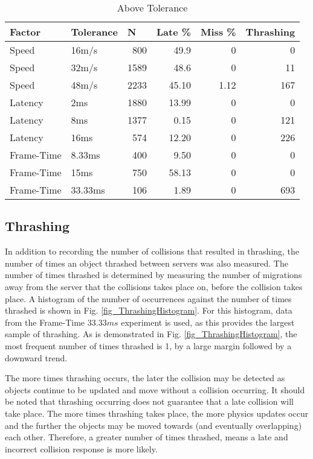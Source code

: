 \begin{table}
	\centering
	\begin{tabular}{llrrrr}
		\toprule
		\multicolumn{1}{l}{Factor} & \multicolumn{1}{l}{Tolerance} & \multicolumn{1}{l}{N} & \multicolumn{1}{l}{Late \%} & \multicolumn{1}{l}{Miss \%} & \multicolumn{1}{l}{Thrashing}  \\ 
		\hline
		Speed      & 16m/s     & 800  &   49.9  & 0           & 0               \\
		Speed      & 32m/s     & 1589  &  48.6  & 0           & 11              \\
		Speed      & 48m/s     & 2233  &  45.10 & 1.12        & 167             \\
		Latency    & 2ms       & 1880  &  13.99 & 0           & 0               \\
		Latency    & 8ms       & 1377  &  0.15  & 0           & 121             \\
		Latency    & 16ms      & 574  &   12.20 & 0           & 226             \\
		Frame-Time & 8.33ms    & 400  &   9.50  & 0           & 0               \\
		Frame-Time & 15ms      & 750  &   58.13 & 0           & 0               \\
		Frame-Time & 33.33ms   & 106  &   1.89  & 0           & 693             \\
		\bottomrule
	\end{tabular}
	\caption{Above Tolerance}
	\label{tab_AboveTolerance}
\end{table}

\subsection{Thrashing}
In addition to recording the number of collisions that resulted in thrashing, the number of times an object thrashed between servers was also measured. The number of times thrashed is determined by measuring the number of migrations away from the server that the collisions takes place on, before the collision takes place. A histogram of the number of occurrences against the number of times thrashed is shown in Fig. \ref{fig_ThrashingHistogram}. For this histogram, data from the Frame-Time $33.33ms$ experiment is used, as this provides the largest sample of thrashing. As is demonstrated in Fig. \ref{fig_ThrashingHistogram}, the most frequent number of times thrashed is 1, by a large margin followed by a downward trend.

The more times thrashing occurs, the later the collision may be detected as objects continue to be updated and move without a collision occurring. It should be noted that thrashing occurring does not guarantee that a late collision will take place. The more times thrashing takes place, the more physics updates occur and the further the objects may be moved towards (and eventually overlapping) each other. Therefore, a greater number of times thrashed, means a late and incorrect collision response is more likely.


